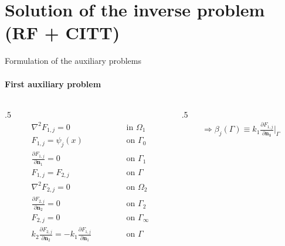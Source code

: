 \documentclass[aspectratio=169]{beamer}
\begin{document}
\section{Solution of the inverse problem (RF + CITT)}
\begin{frame}{Formulation of the auxiliary problems}
	\framesubtitle{First auxiliary problem}
	\begin{columns}
	\begin{column}{.5\textwidth}
	\begin{subequations}
		\begin{alignat*}{2}
		& \nabla^2 F_{1,j} = 0 \quad\quad\quad\quad && \text{ in } \Omega_1  \\
		& F_{1,j} = \psi_j(x) && \text{ on } \Gamma_0   \\
		& \frac{\partial F_{1,j}}{\partial \mathbf{n}_1} = 0 && \text{ on }  \Gamma_1  \\ 
		& F_{1,j} = F_{2, j} \quad\quad\quad\quad\quad && \text{ on }  \Gamma \\
		& \nabla^2 F_{2,j} = 0 && \text{ on }  \Omega_2 \\
		& \frac{\partial F_{2,j}}{\partial \mathbf{n}_2} = 0 && \text{ on }  \Gamma_2 \\
		& F_{2,j} = 0 && \text{ on }  \Gamma_\infty \\
		& k_2\frac{\partial F_{2, j}}{\partial\mathbf{n}_2} = - k_1\frac{\partial F_{1,j}}{\partial\mathbf{n}_1} && \text{ on }  \Gamma 
		\end{alignat*}
	\end{subequations}
	\end{column}
	
	\begin{column}{.5\textwidth}
		\begin{align*}
		\Rightarrow \beta_j(\Gamma) \equiv k_1 \frac{\partial F_{1,j}}{\partial\mathbf{n_1}}\bigg|_\Gamma
		\end{align*}
	\end{column}
	\end{columns}
	
	\begin{center}
	\end{center}
\end{frame}
\end{document}
